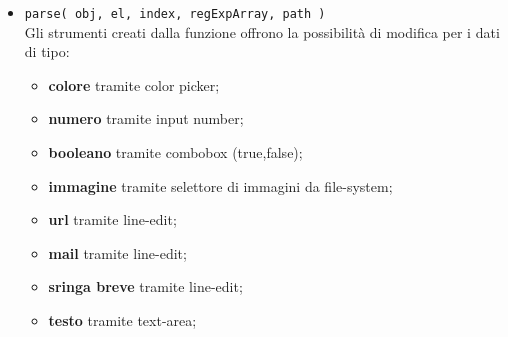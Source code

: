 \begin{itemize}
	\item \texttt{parse( obj, el, index, regExpArray, path )}\\
	Gli strumenti creati dalla funzione offrono la possibilità di modifica per i dati di tipo:
	\begin{itemize}
		\item \textbf{colore} tramite color picker;
		\item \textbf{numero} tramite input number;
		\item \textbf{booleano} tramite combobox (true,false);
		\item \textbf{immagine} tramite selettore di immagini da file-system;
		\item \textbf{url} tramite line-edit;
		\item \textbf{mail} tramite line-edit;
		\item \textbf{sringa breve} tramite line-edit;
		\item \textbf{testo} tramite text-area;
	\end{itemize}
\end{itemize}